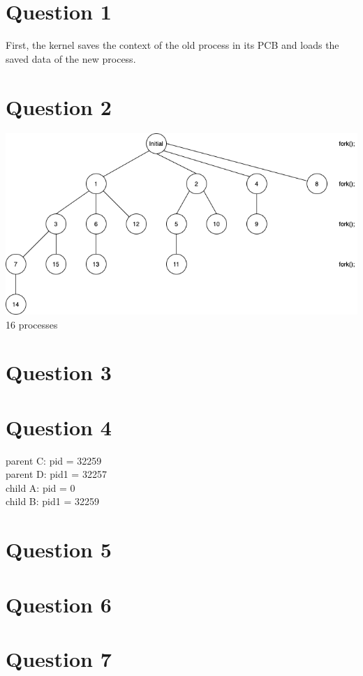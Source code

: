 \documentclass[11pt]{article}
\begin{document}
\maketitle


\section*{Question 1}
    First, the kernel saves the context of the old process
    in its PCB and loads the saved data of the new process.
\section*{Question 2}
\includegraphics[scale=0.52]{COMS352HW2Q2}
16 processes

\section*{Question 3}

\section*{Question 4}
parent C: pid = 32259\\
parent D: pid1 = 32257\\
child A: pid = 0\\
child B: pid1 = 32259\\
\section*{Question 5}

\section*{Question 6}


\section*{Question 7}
\end{document}
